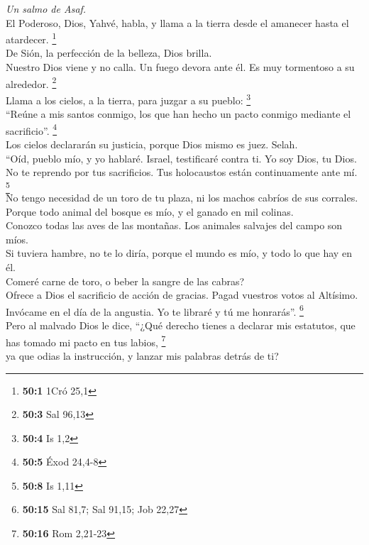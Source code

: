 \emph{Un salmo de Asaf.}\\
 El Poderoso, Dios, Yahvé, habla, y llama a la tierra
desde el amanecer hasta el atardecer. \footnote{\textbf{50:1} 1Cró 25,1}\\
 De Sión, la perfección de la belleza, Dios brilla.\\
 Nuestro Dios viene y no calla. Un fuego devora ante él.
Es muy tormentoso a su alrededor. \footnote{\textbf{50:3} Sal 96,13}\\
 Llama a los cielos, a la tierra, para juzgar a su pueblo:
\footnote{\textbf{50:4} Is 1,2}\\
 ``Reúne a mis santos conmigo, los que han hecho un pacto
conmigo mediante el sacrificio''. \footnote{\textbf{50:5} Éxod 24,4-8}\\
 Los cielos declararán su justicia, porque Dios mismo es
juez. Selah.\\
 ``Oíd, pueblo mío, y yo hablaré. Israel, testificaré
contra ti. Yo soy Dios, tu Dios.\\
 No te reprendo por tus sacrificios. Tus holocaustos están
continuamente ante mí. \footnote{\textbf{50:8} Is 1,11}\\
 No tengo necesidad de un toro de tu plaza, ni los machos
cabríos de sus corrales.\\
 Porque todo animal del bosque es mío, y el ganado en mil
colinas.\\
 Conozco todas las aves de las montañas. Los animales
salvajes del campo son míos.\\
 Si tuviera hambre, no te lo diría, porque el mundo es
mío, y todo lo que hay en él.\\
 Comeré carne de toro, o beber la sangre de las cabras?\\
 Ofrece a Dios el sacrificio de acción de gracias. Pagad
vuestros votos al Altísimo.\\
 Invócame en el día de la angustia. Yo te libraré y tú me
honrarás''. \footnote{\textbf{50:15} Sal 81,7; Sal 91,15; Job 22,27}\\
 Pero al malvado Dios le dice, ``¿Qué derecho tienes a
declarar mis estatutos, que has tomado mi pacto en tus labios,
\footnote{\textbf{50:16} Rom 2,21-23}\\
 ya que odias la instrucción, y lanzar mis palabras
detrás de ti?\\
